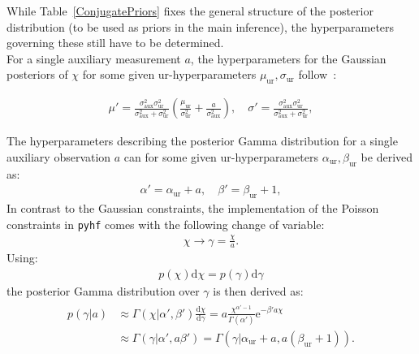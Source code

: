 \noindent While Table~\ref{ConjugatePriors} fixes the general structure of the posterior distribution (to be used as priors in the main inference), the hyperparameters governing these still have to be determined. \\
For a single auxiliary measurement $a$, the hyperparameters for the Gaussian posteriors of $\chi$ for some given ur-hyperparameters $\mu_{\text{ur}}, \sigma_{\text{ur}}$ follow~\cite{Murphy2007}:

    \begin{align} \label{BayesConj}
        \mu'= \frac{\sigma_{\text{aux}}^2 \sigma_{\text{ur}}^2}{\sigma_{\text{aux}}^2 + \sigma_{\text{ur}}^2} \left( \frac{\mu_{\text{ur}}}{\sigma_{\text{ur}}^2} + \frac{a}{\sigma_{\text{aux}}^2}\right) , \quad \sigma' = \frac{\sigma_{\text{aux}}^2 \sigma_{\text{ur}}^2}{\sigma_{\text{aux}}^2 + \sigma_{\text{ur}}^2},
    \end{align}

\noindent The hyperparameters describing the posterior Gamma distribution for a single auxiliary observation $a$ can for some given ur-hyperparameters $\alpha_{\text{ur}}, \beta_{\text{ur}}$ be derived as:
    \begin{align} \label{PoissonUpdating}
        \alpha' = \alpha_{\text{ur}} + a, \quad \beta' = \beta_{\text{ur}} + 1,
    \end{align}
\noindent In contrast to the Gaussian constraints, the implementation of the Poisson constraints in \texttt{pyhf} comes with the following change of variable:
    \begin{align} \label{}
        \chi  \rightarrow \gamma = \frac{\chi}{a}.
    \end{align}
\noindent Using:
    \begin{align}
        p(\chi) \mathrm{d} \chi = p(\gamma) \mathrm{d} \gamma
    \end{align}
\noindent the posterior Gamma distribution over $\gamma$ is then derived as:
    \begin{align}
    \begin{split}
        p(\gamma | a ) &\approx \Gamma(\chi | \alpha', \beta') \frac{\mathrm{d} \chi}{\mathrm{d} \gamma} = a \frac{\chi^{\alpha'-1}}{\Gamma(\alpha')} \text{e}^{-\beta' a \chi} \\
        &\approx \Gamma(\gamma | \alpha', a\beta') = \Gamma(\gamma | \alpha_{\text{ur}} + a, a(\beta_{\text{ur}} + 1)).
    \end{split}
    \end{align}

